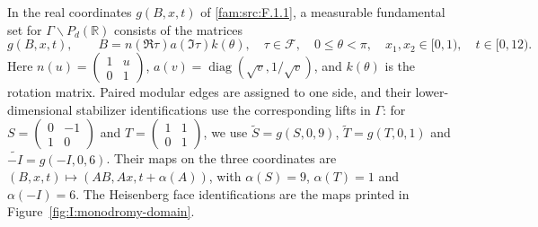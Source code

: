 \begin{proposition}
\hypertarget{tag-0001}{}\label{I:monodromy-fundamental-set}
In the real coordinates $g(B,x,t)$ of
\ref{fam:src:F.1.1}, a measurable fundamental set for
$\Gamma\backslash P_d(\mathbb R)$ consists of the matrices
\[
 g(B,x,t),\qquad
 B=n(\Re\tau)a(\Im\tau)k(\theta),\quad
 \tau\in\mathcal F,\quad 0\le\theta<\pi,
 \quad x_1,x_2\in[0,1),\quad t\in[0,12).
\]
Here
$n(u)=\left(\begin{smallmatrix}1&u\\0&1\end{smallmatrix}\right)$,
$a(v)=\operatorname{diag}(\sqrt v,1/\sqrt v)$,
and $k(\theta)$ is the rotation matrix. Paired modular edges
are assigned to one side, and their lower-dimensional
stabilizer identifications use the corresponding lifts in
$\Gamma$: for
$S=\left(\begin{smallmatrix}0&-1\\1&0\end{smallmatrix}\right)$
and $T=\left(\begin{smallmatrix}1&1\\0&1\end{smallmatrix}\right)$,
we use $\widetilde S=g(S,0,9)$,
$\widetilde T=g(T,0,1)$ and
$\widetilde{-I}=g(-I,0,6)$.
Their maps on the three coordinates are
$(B,x,t)\mapsto(AB,Ax,t+\alpha(A))$, with
$\alpha(S)=9$, $\alpha(T)=1$ and $\alpha(-I)=6$.
The Heisenberg face identifications are the
maps printed in Figure~\ref{fig:I:monodromy-domain}.
\end{proposition}
